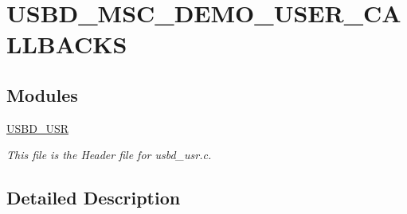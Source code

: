 \hypertarget{group___u_s_b_d___m_s_c___d_e_m_o___u_s_e_r___c_a_l_l_b_a_c_k_s}{\section{U\-S\-B\-D\-\_\-\-M\-S\-C\-\_\-\-D\-E\-M\-O\-\_\-\-U\-S\-E\-R\-\_\-\-C\-A\-L\-L\-B\-A\-C\-K\-S}
\label{group___u_s_b_d___m_s_c___d_e_m_o___u_s_e_r___c_a_l_l_b_a_c_k_s}
}
\subsection*{Modules}
\begin{DoxyCompactItemize}
\item 
\hyperlink{group___u_s_b_d___u_s_r}{U\-S\-B\-D\-\_\-\-U\-S\-R}
\begin{DoxyCompactList}\small\item\em This file is the Header file for usbd\-\_\-usr.\-c. \end{DoxyCompactList}\end{DoxyCompactItemize}


\subsection{Detailed Description}
